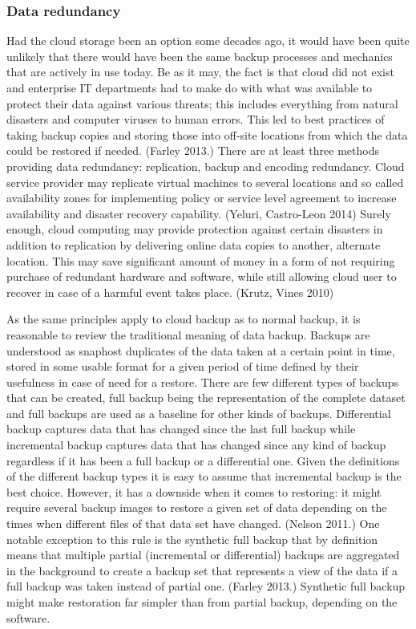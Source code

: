\documentclass{article}
\begin{document}
\subsubsection{Data redundancy}
Had the cloud storage been an option some decades ago, it would have been quite unlikely that there would have been the same backup processes and mechanics that are actively in use today. Be as it may, the fact is that cloud did not exist and enterprise IT departments had to make do with what was available to protect their data against various threats; this includes everything from natural disasters and computer viruses to human errors. This led to best practices of taking backup copies and storing those into off-site locations from which the data could be restored if needed. (Farley 2013.) 
There are at least three methods providing data redundancy: replication, backup and encoding redundancy. Cloud service provider may replicate virtual machines to several locations and so called availability zones for implementing policy or service level agreement to increase availability and disaster recovery capability. (Yeluri, Castro-Leon 2014) Surely enough, cloud computing may provide protection against certain disasters in addition to replication by delivering online data copies to another, alternate location. This may save significant amount of money in a form of not requiring purchase of redundant hardware and software, while still allowing cloud user to recover in case of a harmful event takes place. (Krutz, Vines 2010)
\par
As the same principles apply to cloud backup as to normal backup, it is reasonable to review the traditional meaning of data backup. Backups are understood as snaphost duplicates of the data taken at a certain point in time, stored in some usable format for a given period of time defined by their usefulness in case of need for a restore. There are few different types of backups that can be created, full backup being the representation of the complete dataset and full backups are used as a baseline for other kinds of backups. Differential backup captures data that has changed since the last full backup while incremental backup captures data that has changed since any kind of backup regardless if it has been a full backup or a differential one. Given the definitions of the different backup types it is easy to assume that incremental backup is the best choice. However, it has a downside when it comes to restoring: it might require several backup images to restore a given set of data depending on the times when different files of that data set have changed. (Nelson 2011.) One notable exception to this rule is the synthetic full backup that by definition means that multiple partial (incremental or differential) backups are aggregated in the background to create a backup set that represents a view of the data if a full backup was taken instead of partial one. (Farley 2013.) Synthetic full backup might make restoration far simpler than from partial backup, depending on the software.
\end{document}
